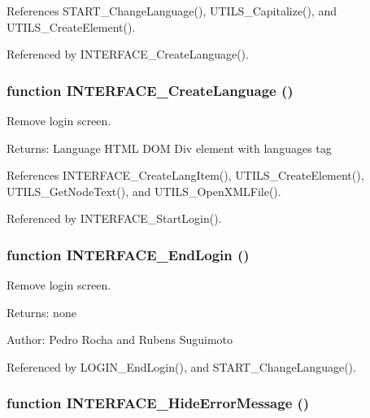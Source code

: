 References START\_\-ChangeLanguage(), UTILS\_\-Capitalize(), and UTILS\_\-CreateElement().

Referenced by INTERFACE\_\-CreateLanguage().
\subsubsection[INTERFACE\_\-CreateLanguage]{\setlength{\rightskip}{0pt plus 5cm}function INTERFACE\_\-CreateLanguage ()}\label{interface_2login_8js_279f5cc233f1ef13bd5a2ec50a63254b}


Remove login screen. 

\begin{Desc}
\item[Returns:]Language HTML DOM Div element with languages tag \end{Desc}


References INTERFACE\_\-CreateLangItem(), UTILS\_\-CreateElement(), UTILS\_\-GetNodeText(), and UTILS\_\-OpenXMLFile().

Referenced by INTERFACE\_\-StartLogin().
\subsubsection[INTERFACE\_\-EndLogin]{\setlength{\rightskip}{0pt plus 5cm}function INTERFACE\_\-EndLogin ()}\label{interface_2login_8js_3848d3b3123f0fd40ec010833f8f89a8}


Remove login screen. 

\begin{Desc}
\item[Returns:]none \end{Desc}
\begin{Desc}
\item[Author:]Pedro Rocha and Rubens Suguimoto \end{Desc}


Referenced by LOGIN\_\-EndLogin(), and START\_\-ChangeLanguage().
\subsubsection[INTERFACE\_\-HideErrorMessage]{\setlength{\rightskip}{0pt plus 5cm}function INTERFACE\_\-HideErrorMessage ()}\label{interface_2login_8js_6270ed4dd99140596b7fc720ab6c8d12}


